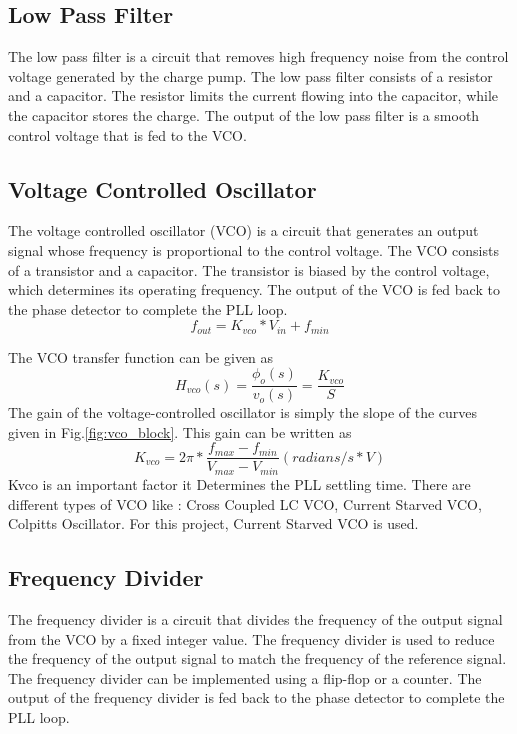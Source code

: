 \subsection{Low Pass Filter}
The low pass filter is a circuit that removes high frequency noise from the control voltage generated by the charge pump. The low pass filter consists of a resistor and a capacitor. The resistor limits the current flowing into the capacitor, while the capacitor stores the charge. The output of the low pass filter is a smooth control voltage that is fed to the VCO.
% 


\subsection{Voltage Controlled Oscillator}
The voltage controlled oscillator (VCO) is a circuit that generates an output signal whose frequency is proportional to the control voltage. The VCO consists of a transistor and a capacitor. The transistor is biased by the control voltage, which determines its operating frequency. The output of the VCO is fed back to the phase detector to complete the PLL loop.
\begin{equation}
	\label{eq:vco_char}
	f_{out} = K_{vco} * V_{in} + f_{min}
\end{equation}

The VCO transfer function can be given as
\begin{equation}
	\label{eq:vco_tf}
	H_{vco}(s) = \frac{\phi_{o}(s)}{v_{o}(s)} = \frac{K_{vco}}{S}
\end{equation}
The gain of the voltage-controlled oscillator is simply the slope of the curves given in Fig.\ref{fig:vco_block}. This gain can be written as
\begin{equation}
	\label{eq:vco_gain}
	K_{vco} = 2\pi  * \frac{f_{max} - f_{min}}{V_{max} - V_{min}}(radians/s * V)
\end{equation}
Kvco is an important factor it Determines the PLL settling time.
There are different types of VCO like : Cross Coupled LC VCO, Current Starved VCO, Colpitts Oscillator. For this project, Current Starved VCO is used.
\subsection{Frequency Divider}
The frequency divider is a circuit that divides the frequency of the output signal from the VCO by a fixed integer value. The frequency divider is used to reduce the frequency of the output signal to match the frequency of the reference signal. The frequency divider can be implemented using a flip-flop or a counter. The output of the frequency divider is fed back to the phase detector to complete the PLL loop.
